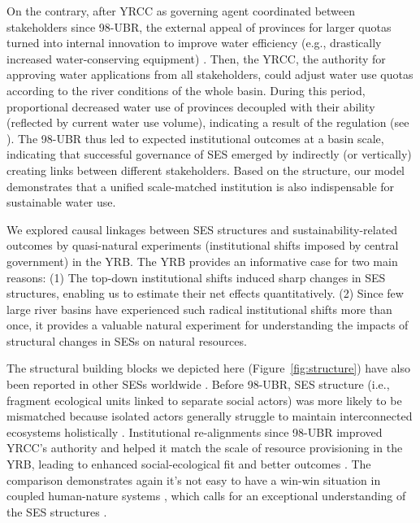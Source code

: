 \label{discussion-3}
On the contrary, after YRCC as governing agent coordinated between stakeholders since 98-UBR, the external appeal of provinces for larger quotas turned into internal innovation to improve water efficiency (e.g., drastically increased water-conserving equipment)
\cite{krieger1955, ostrom1990}.
Then, the YRCC, the authority for approving water applications from all stakeholders, could adjust water use quotas according to the river conditions of the whole basin.
During this period, proportional decreased water use of provinces decoupled with their ability (reflected by current water use volume), indicating a result of the regulation (see ).
The 98-UBR thus led to expected institutional outcomes at a basin scale, indicating that successful governance of SES emerged by indirectly (or vertically) creating links between different stakeholders.
Based on the structure, our model demonstrates that a unified scale-matched institution is also indispensable for sustainable water use.

We explored causal linkages between SES structures and sustainability-related outcomes by quasi-natural experiments (institutional shifts imposed by central government) in the YRB.
The YRB provides an informative case for two main reasons:
(1) The top-down institutional shifts induced sharp changes in SES structures, enabling us to estimate their net effects quantitatively.
(2) Since few large river basins have experienced such radical institutional shifts more than once, it provides a valuable natural experiment for understanding the impacts of structural changes in SESs on natural resources.

The structural building blocks we depicted here (Figure~\ref{fig:structure}) have also been reported in other SESs worldwide \cite{kluger2020,guerrero2015,bodin2012}.
Before 98-UBR, SES structure (i.e., fragment ecological units linked to separate social actors) was more likely to be mismatched because isolated actors generally struggle to maintain interconnected ecosystems holistically \cite{sayles2017,sayles2019,cai2016,bergsten2019}.
Institutional re-alignments since 98-UBR improved YRCC's authority and helped it match the scale of resource provisioning in the YRB, leading to enhanced social-ecological fit and better outcomes \cite{cumming2020a,wang2019d}.
The comparison demonstrates again it's not easy to have a win-win situation in coupled human-nature systems \cite{hegwood2022}, which calls for an exceptional understanding of the SES structures \cite{bergsten2019, sayles2019}.


